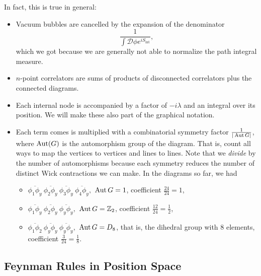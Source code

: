 In fact, this is true in general:
\begin{itemize}
\item Vacuum bubbles are cancelled by the expansion of the denominator 
  \begin{equation}
    \frac{1}{\int \mathcal{D}\phi e^{iS_\text{int}}},
  \end{equation}
  which we got because we are generally not able to normalize the path
  integral measure.
\item $n$-point correlators are sums of products of disconnected
  correlators plus the connected diagrams.
\item Each internal node is accompanied by a factor of $-i\lambda$ and
  an integral over its position. We will make these also part of the
  graphical notation.
\item Each term comes is multiplied with a combinatorial symmetry
  factor $\frac{1}{|\operatorname{Aut} G|}$, where $\operatorname{Aut}(G)$ is the automorphism
  group of the diagram. That is, count all ways to map the vertices to
  vertices and lines to lines. Note that we \emph{divide} by the
  number of automorphisms because each symmetry reduces the number of
  distinct Wick contractions we can make. In the diagrams so far, we had
  \begin{itemize}
  \item
    \begin{math}
      \overline{\phi_1 \phi_y}~
      \overline{\phi_2 \phi_y}~
      \overline{\phi_3 \phi_y}~
      \overline{\phi_4 \phi_y},
    \end{math}
    $\operatorname{Aut} G = 1$, coefficient $\tfrac{24}{24} = 1$,
  \item 
    \begin{math}
      \overline{\phi_1 \phi_y}~
      \overline{\phi_2 \phi_y}~
      \overline{\phi_y \phi_y},
    \end{math}
    $\operatorname{Aut} G = \mathbb{Z}_2$, coefficient $\tfrac{12}{24} = \tfrac{1}{2}$,
  \item 
    \begin{math}
      \overline{\phi_1 \phi_2}~
      \overline{\phi_y \phi_y}~
      \overline{\phi_y \phi_y},
    \end{math}
    $\operatorname{Aut} G = D_8$, that is, the dihedral group with $8$ elements,
    coefficient $\tfrac{3}{24} = \tfrac{1}{8}$.
  \end{itemize}
\end{itemize}


\subsection{Feynman Rules in Position Space}

